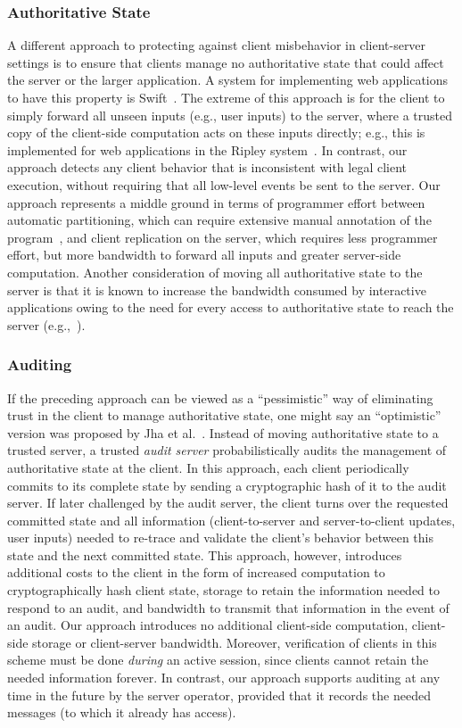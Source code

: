 \subsubsection{Authoritative State}
A different approach to protecting against client misbehavior in
client-server settings is to ensure that clients manage no
authoritative state that could affect the server or the larger
application.  A  system for implementing web applications to have this
property is Swift~\cite{chong07:swift}.  The extreme of this approach
is for the client to simply forward all unseen inputs (e.g., user
inputs) to the server, where a trusted copy of the client-side
computation acts on these inputs directly; e.g., this is implemented
for web applications in the Ripley system~\cite{vikram09:ripley}.  In
contrast, our approach detects any client behavior that is
inconsistent with legal client execution, without requiring that all
low-level events be sent to the server. Our approach represents a
middle ground in terms of programmer effort between automatic
partitioning, which can require extensive manual annotation of the
program~\cite{chong07:swift}, and client replication on the server,
which requires less programmer effort, but more bandwidth to forward
all inputs and greater server-side computation. Another consideration
of moving all authoritative state to the server is that it is known to
increase the bandwidth consumed by interactive applications owing to
the need for every access to authoritative state to reach the server
(e.g.,~\cite[p.~112]{mulligan03:guide}).

\subsubsection{Auditing}
If the preceding approach can be viewed as a ``pessimistic'' way of
eliminating trust in the client to manage authoritative state, one
might say an ``optimistic'' version was proposed by Jha et
al.~\cite{jha07:integrity}.  Instead of moving authoritative state to
a trusted server, a trusted {\em audit server} probabilistically
audits the management of authoritative state at the client.  In this
approach, each client periodically commits to its complete state by
sending a cryptographic hash of it to the audit server.  If later
challenged by the audit server, the client turns over the requested
committed state and all information (client-to-server and
server-to-client updates, user inputs) needed to re-trace and validate
the client's behavior between this state and the next committed state.
This approach, however, introduces additional costs to the client in
the form of increased computation to cryptographically hash client
state, storage to retain the information needed to respond to an
audit, and bandwidth to transmit that information in the event of an
audit.  Our approach introduces no additional client-side computation,
client-side storage or client-server bandwidth.  Moreover,
verification of clients in this scheme must be done {\em during} an
active session, since clients cannot retain the needed information
forever.  In contrast, our approach supports auditing at any time in
the future by the server operator, provided that it records the needed
messages (to which it already has access).

